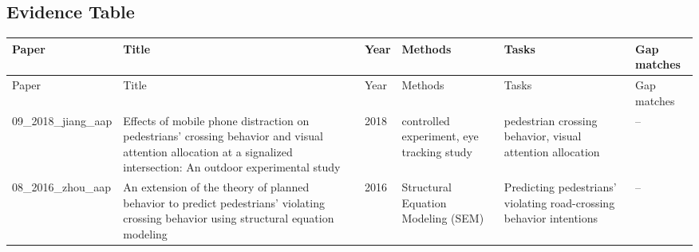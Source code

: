 \documentclass{article}
\begin{document}
\subsection{Evidence Table}
\begin{longtable}{p{}p{}p{}p{}p{}p{}}
\toprule
Paper & Title & Year & Methods & Tasks & Gap matches \\
\midrule
\endfirsthead
\toprule
Paper & Title & Year & Methods & Tasks & Gap matches \\
\midrule
\endhead
09\_2018\_jiang\_aap & Effects of mobile phone distraction on pedestrians' crossing behavior and visual attention allocation at a signalized intersection: An outdoor experimental study & 2018 & controlled experiment, eye tracking study & pedestrian crossing behavior, visual attention allocation & -- \\
08\_2016\_zhou\_aap & An extension of the theory of planned behavior to predict pedestrians' violating crossing behavior using structural equation modeling & 2016 & Structural Equation Modeling (SEM) & Predicting pedestrians' violating road-crossing behavior intentions & -- \\
\bottomrule
\end{longtable}
\end{document}
